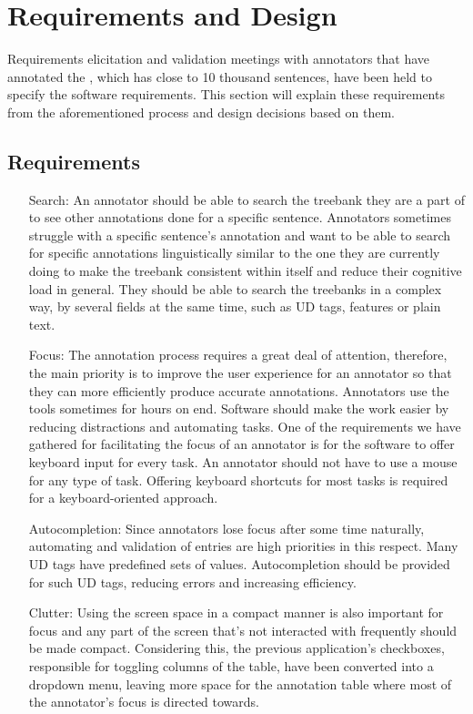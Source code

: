 \section{Requirements and Design}
\label{sec:requirements}

Requirements elicitation and validation meetings with annotators that have annotated the \bountreebank{}, which has close to 10 thousand sentences, have been held to specify the software requirements.
This section will explain these requirements from the aforementioned process and design decisions based on them.

\subsection{Requirements}
\begin{itemize}[before=\normalfont, font=\itshape, align=left]
\item[Search:]
An annotator should be able to search the treebank they are a part of to see other annotations done for a specific sentence.
Annotators sometimes struggle with a specific sentence's annotation and want to be able to search for specific annotations linguistically similar to the one they are currently doing to make the treebank consistent within itself and reduce their cognitive load in general.
They should be able to search the treebanks in a complex way, by several fields at the same time, such as UD tags, features or plain text.

\item[Focus:]
The annotation process requires a great deal of attention, therefore, the main priority is to improve the user experience for an annotator so that they can more efficiently produce accurate annotations.
Annotators use the tools sometimes for hours on end.
Software should make the work easier by reducing distractions and automating tasks.
One of the requirements we have gathered for facilitating the focus of an annotator is for the software to offer keyboard input for every task.
An annotator should not have to use a mouse for any type of task.
Offering keyboard shortcuts for most tasks is required for a keyboard-oriented approach.

\item[Autocompletion:]
Since annotators lose focus after some time naturally, automating and validation of entries are high priorities in this respect.
Many UD tags have predefined sets of values.
Autocompletion should be provided for such UD tags, reducing errors and increasing efficiency.

\item[Clutter:]
Using the screen space in a compact manner is also important for focus and any part of the screen that's not interacted with frequently should be made compact.
Considering this, the previous application's checkboxes, responsible for toggling columns of the table, have been converted into a dropdown menu, leaving more space for the annotation table where most of the annotator's focus is directed towards.
\end{itemize}

